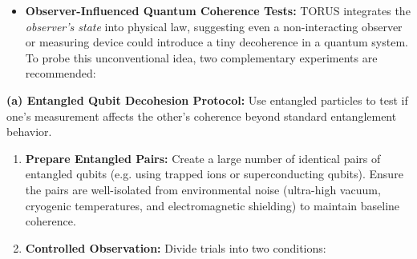 \documentclass[
]{article}
\begin{document}
\begin{itemize}
\item
  \textbf{Observer-Influenced Quantum Coherence Tests:} TORUS integrates
  the \emph{observer's state} into physical law, suggesting even a
  non-interacting observer or measuring device could introduce a tiny
  decoherence in a quantum system\hspace{0pt}. To probe this
  unconventional idea, two complementary experiments are recommended:
\end{itemize}

\textbf{(a) Entangled Qubit Decohesion Protocol:} Use entangled
particles to test if one's measurement affects the other's coherence
beyond standard entanglement behavior.

\begin{enumerate}
\def\labelenumi{\arabic{enumi}.}
\item
  \textbf{Prepare Entangled Pairs:} Create a large number of identical
  pairs of entangled qubits (e.g. using trapped ions or superconducting
  qubits). Ensure the pairs are well-isolated from environmental noise
  (ultra-high vacuum, cryogenic temperatures, and electromagnetic
  shielding) to maintain baseline coherence.
\item
  \textbf{Controlled Observation:} Divide trials into two conditions:


\end{enumerate}
\end{document}
